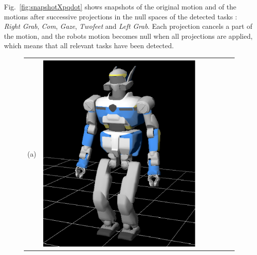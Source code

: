 \documentclass[journal]{IEEEtran}
\begin{document}
Fig.~\ref{fig:snapshotXpqdot} shows snapshots of the original motion
and of the motions after successive projections
in the null spaces of the detected
tasks : \emph{Right Grab}, \emph{Com}, \emph{Gaze}, \emph{Twofeet} and \emph{Left Grab}.
Each projection cancels a part of the motion, and the robots motion becomes null when all
projections are applied,
which means that all relevant tasks have been detected.
\begin{figure}[t]
\centering
\begin{tabular}{c@{}c@{}c@{}c@{}c@{}c@{}c}
(a)&
\parbox[c]{2.2cm}{\includegraphics[width=\linewidth]{img/Pqdot0_0.png.ps}} &

\end{tabular}
\end{figure}
\end{document}
